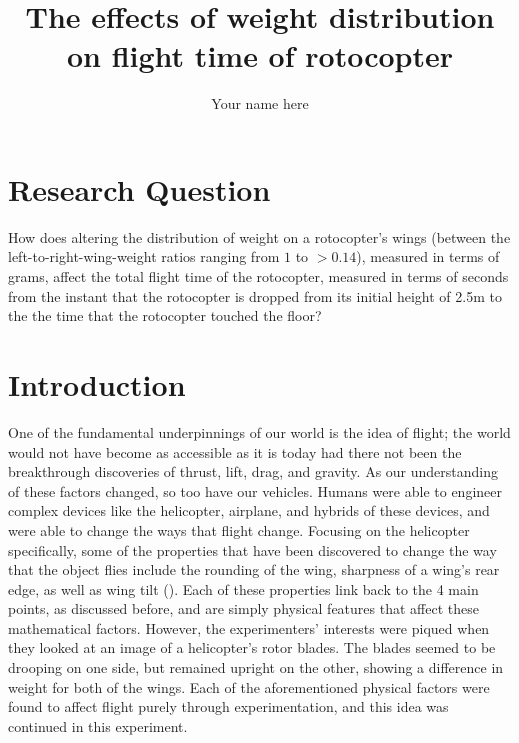 \documentclass[]{article}
\title{\Huge The effects of weight distribution on flight time of rotocopter}
\author{\LARGE Your name here}
\date{}
\begin{document}
\maketitle

\newpage

\tableofcontents
\newpage


\section{Research Question}
How does altering the distribution of weight on a rotocopter's wings (between the left-to-right-wing-weight ratios ranging from $1$ to $>0.14$), measured in terms of grams, affect the total flight time of the rotocopter, measured in terms of seconds from the instant that the rotocopter is dropped from its initial height of 2.5m to the the time that the rotocopter touched the floor?

\section{Introduction}
One of the fundamental underpinnings of our world is the idea of flight; the world would not have become as accessible as it is today had there not been the breakthrough discoveries of thrust, lift, drag, and gravity. As our understanding of these factors changed, so too have our vehicles. Humans were able to engineer complex devices like the helicopter, airplane, and hybrids of these devices, and were able to change the ways that flight change. Focusing on the helicopter specifically, some of the properties that have been discovered to change the way that the object flies include the rounding of the wing, sharpness of a wing's rear edge, as well as wing tilt (). Each of these properties link back to the 4 main points, as discussed before, and are simply physical features that affect these mathematical factors. However, the experimenters' interests were piqued when they looked at an image of a helicopter's rotor blades. The blades seemed to be drooping on one side, but remained upright on the other, showing a difference in weight for both of the wings. Each of the aforementioned physical factors were found to affect flight purely through experimentation, and this idea was continued in this experiment.
\end{document}
